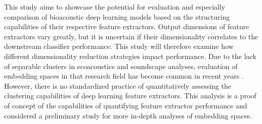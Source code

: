 This study aims to showcase the potential for evaluation and especially comparison of bioacoustic deep learning models based on the structuring capabilities of their respective feature extractors.
Output dimensions of feature extractors vary greatly, but it is uncertain if their dimensionality correlates to the downstream classifier performance. 
This study will therefore examine how different dimensionality reduction strategies impact performance. 
Due to the lack of separable clusters in ecoacoustics and soundscape analyses, evaluation of embedding spaces in that research field has become common in recent years \cite{sethi_characterizing_2020,calonge_revised_2024,parcerisas_categorizing_2023}. 
However, there is no standardized practice of quantitatively assessing the clustering capabilities of deep learning feature extractors. 
This analysis is a proof of concept of the capabilities of quantifying feature extractor performance and considered a preliminary study for more in-depth analyses of embedding spaces. 






